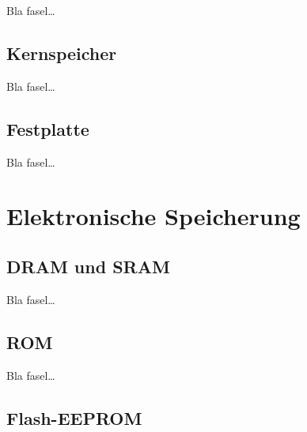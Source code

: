             Bla fasel\ldots
            
        \subsection{Kernspeicher}
        \label{ch:Technisch:sec:Magnetische Speicherung:sub:Kernspeicher}
        
            Bla fasel\ldots
            
        \subsection{Festplatte}
        \label{ch:Technisch:sec:Magnetische Speicherung:sub:Festplatte}
        
            Bla fasel\ldots
    
    \section{Elektronische Speicherung}
    \label{ch:Technisch:sec:Elektronische Speicherung}
        \subsection{DRAM und SRAM}
        \label{ch:Technisch:sec:Elektronische Speicherung:sub:DRAM und SRAM}
        
            Bla fasel\ldots
        
        \subsection{ROM}
        \label{ch:Technisch:sec:Elektronische Speicherung:sub:ROM}
        
            Bla fasel\ldots
            
        \subsection{Flash-EEPROM}
        \label{ch:Technisch:sec:Elektronische Speicherung:sub:Flash-EEPROM}
        
